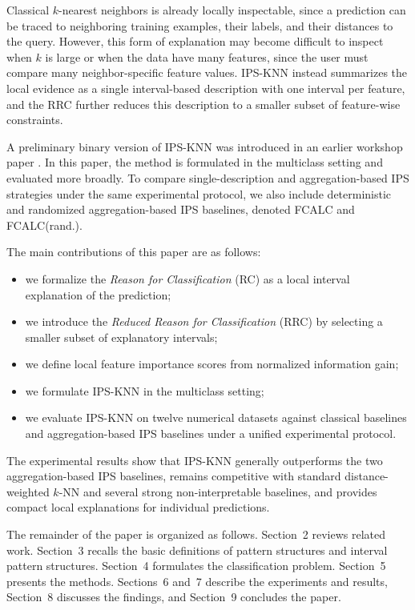 \documentclass[a4paper,fleqn]{cas-sc}
\begin{document}
Classical \(k\)-nearest neighbors is already locally inspectable, since a prediction can be traced to neighboring training examples, their labels, and their distances to the query. However, this form of explanation may become difficult to inspect when \(k\) is large or when the data have many features, since the user must compare many neighbor-specific feature values. IPS-KNN instead summarizes the local evidence as a single interval-based description with one interval per feature, and the RRC further reduces this description to a smaller subset of feature-wise constraints.

A preliminary binary version of IPS-KNN was introduced in an earlier workshop paper \cite{tomat2023interval}. In this paper, the method is formulated in the multiclass setting and evaluated more broadly. To compare single-description and aggregation-based IPS strategies under the same experimental protocol, we also include deterministic and randomized aggregation-based IPS baselines, denoted FCALC and FCALC(rand.).

The main contributions of this paper are as follows:
\begin{itemize}
    \item we formalize the \textit{Reason for Classification} (RC) as a local interval explanation of the prediction;
    \item we introduce the \textit{Reduced Reason for Classification} (RRC) by selecting a smaller subset of explanatory intervals;
    \item we define local feature importance scores from normalized information gain;
    \item we formulate IPS-KNN in the multiclass setting;
    \item we evaluate IPS-KNN on twelve numerical datasets against classical baselines and aggregation-based IPS baselines under a unified experimental protocol.
\end{itemize}

The experimental results show that IPS-KNN generally outperforms the two aggregation-based IPS baselines, remains competitive with standard distance-weighted \(k\)-NN and several strong non-interpretable baselines, and provides compact local explanations for individual predictions.

The remainder of the paper is organized as follows. Section~2 reviews related work. Section~3 recalls the basic definitions of pattern structures and interval pattern structures. Section~4 formulates the classification problem. Section~5 presents the methods. Sections~6 and~7 describe the experiments and results, Section~8 discusses the findings, and Section~9 concludes the paper.
\end{document}
